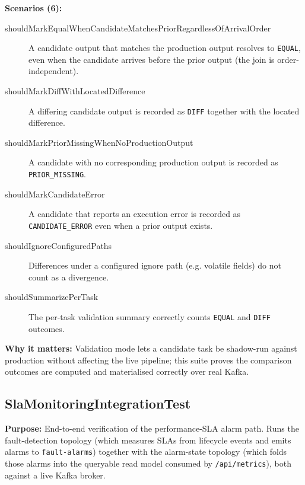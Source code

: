 \textbf{Scenarios (6):}

\begin{description}

\item[shouldMarkEqualWhenCandidateMatchesPriorRegardlessOfArrivalOrder] A
candidate output that matches the production output resolves to
\texttt{EQUAL}, even when the candidate arrives before the prior output
(the join is order-independent).

\item[shouldMarkDiffWithLocatedDifference] A differing candidate output is
recorded as \texttt{DIFF} together with the located difference.

\item[shouldMarkPriorMissingWhenNoProductionOutput] A candidate with no
corresponding production output is recorded as \texttt{PRIOR\_MISSING}.

\item[shouldMarkCandidateError] A candidate that reports an execution error
is recorded as \texttt{CANDIDATE\_ERROR} even when a prior output exists.

\item[shouldIgnoreConfiguredPaths] Differences under a configured ignore
path (e.g. volatile fields) do not count as a divergence.

\item[shouldSummarizePerTask] The per-task validation summary correctly
counts \texttt{EQUAL} and \texttt{DIFF} outcomes.

\end{description}

\textbf{Why it matters:} Validation mode lets a candidate task be shadow-run
against production without affecting the live pipeline; this suite proves the
comparison outcomes are computed and materialised correctly over real Kafka.


\subsection{SlaMonitoringIntegrationTest}
\label{it:slaMonitoring}

\textbf{Purpose:} End-to-end verification of the performance-SLA alarm path. Runs
the fault-detection topology (which measures SLAs from lifecycle events and emits
alarms to \texttt{fault-alarms}) together with the alarm-state topology (which
folds those alarms into the queryable read model consumed by \texttt{/api/metrics}),
both against a live Kafka broker.

